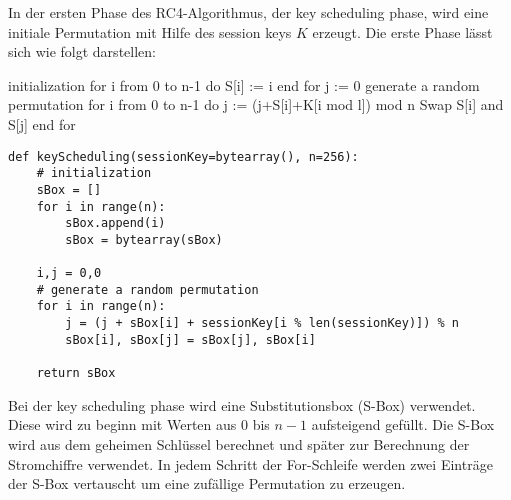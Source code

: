 \documentclass[10pt,a4paper]{article}
\begin{document}
In der ersten Phase des RC4-Algorithmus, der key scheduling phase, wird eine initiale Permutation mit Hilfe des session keys $K$ erzeugt. Die erste Phase lässt sich wie folgt darstellen:\\
\begin{center}
\hspace{5pt}
\begin{minipage}[t]{.35\textwidth}
\begin{algorithm}
{initialization}
for i from 0 to n-1 do
    S[i] := i
end for
j := 0
{generate a random permutation}
for i from 0 to n-1 do
    j := (j+S[i]+K[i mod l]) mod n
    Swap S[i] and S[j]
end for
\end{algorithm}
\end{minipage}\hspace{0.4cm}
\begin{minipage}[t]{.60\textwidth}
  \begin{lstlisting}
def keyScheduling(sessionKey=bytearray(), n=256):
	# initialization
	sBox = []
	for i in range(n):
   		sBox.append(i)
   		sBox = bytearray(sBox)

   	i,j = 0,0
   	# generate a random permutation
   	for i in range(n):
     	j = (j + sBox[i] + sessionKey[i % len(sessionKey)]) % n
    	sBox[i], sBox[j] = sBox[j], sBox[i]

	return sBox
\end{lstlisting}
\end{minipage}
\end{center}

Bei der key scheduling phase wird eine Substitutionsbox (S-Box) verwendet. Diese wird zu beginn mit Werten aus 0 bis $n-1$ aufsteigend gefüllt. Die S-Box wird aus dem geheimen Schlüssel berechnet und später zur Berechnung der Stromchiffre verwendet. In jedem Schritt der For-Schleife werden zwei Einträge der S-Box vertauscht um eine zufällige Permutation zu erzeugen. 
\end{document}
